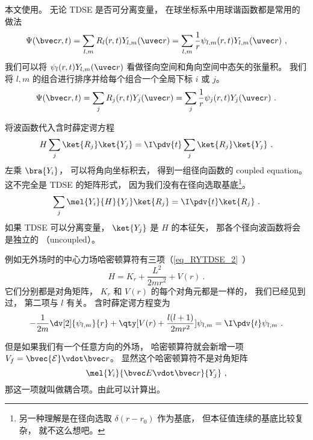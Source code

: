
\begin{issues}
\issueAbstract
{}
\end{issues}


本文使用。 无论 TDSE 是否可分离变量， 在球坐标系中用球谐函数都是常用的做法
\begin{equation}\label{eq_RYTDSE_1}
\Psi(\bvec r, t) = \sum_{l,m} R_l (r, t) Y_{l,m} (\uvec r) = \sum_{l,m} \frac{1}{r} \psi_{l,m} (r, t) Y_{l,m} (\uvec r)~,
\end{equation}
我们可以将 $\psi_l (r, t) Y_{l,m} (\uvec r)$ 看做径向空间和角向空间中态矢的张量积。 我们将 $l, m$ 的组合进行排序并给每个组合一个全局下标 $i$ 或 $j$。
\begin{equation}
\Psi(\bvec r, t) = \sum_j R_j (r, t) Y_j (\uvec r) = \sum_j \frac{1}{r} \psi_j (r, t) Y_j (\uvec r)~.
\end{equation}

将波函数代入含时薛定谔方程
\begin{equation}
H \sum_j\ket{R_j}\ket{Y_j} = \I \pdv{t}  \sum_j\ket{R_j}\ket{Y_j}~.
\end{equation}
左乘 $\bra{Y_i}$， 可以将角向坐标积去， 得到一组径向函数的 coupled equation。 这不完全是 TDSE 的矩阵形式， 因为我们没有在径向选取基底\footnote{另一种理解是在径向选取 $\delta(r - r_0)$ 作为基底， 但本征值连续的基底比较复杂， 就不这么想吧。}。
\begin{equation}
\sum_j \mel{Y_i}{H}{Y_j} \ket{R_j} = \I \pdv{t} \ket{R_j}~.
\end{equation}
如果 TDSE 可以分离变量， $\ket{Y_j}$ 是 $H$ 的本征矢， 那各个径向波函数将会是独立的 （uncoupled）。

例如无外场时的中心力场哈密顿算符有三项（\autoref{eq_RYTDSE_2}~）
\begin{equation}
H = K_r + \frac{L^2}{2mr^2} + V(r)~.
\end{equation}
它们分别都是对角矩阵， $K_r$ 和 $V(r)$ 的每个对角元都是一样的， 我们已经见到过， 第二项与 $l$ 有关。 含时薛定谔方程变为
\begin{equation}
-\frac{1}{2m} \dv[2]{\psi_{l,m}}{r} + \qty[V(r) + \frac{l(l + 1)}{2mr^2}]\psi_{l,m} = \I \pdv{t} \psi_{l,m}~.
\end{equation}

但是如果我们有一个任意方向的外场， 哈密顿算符就会新增一项 $V_f = \bvec {\mathcal E} \vdot \bvec r$。 显然这个哈密顿算符不是对角矩阵
\begin{equation}
\mel{Y_i}{\bvec E \vdot \bvec r}{Y_j}~,
\end{equation}
那这一项就叫做耦合项。由此可以计算出。
